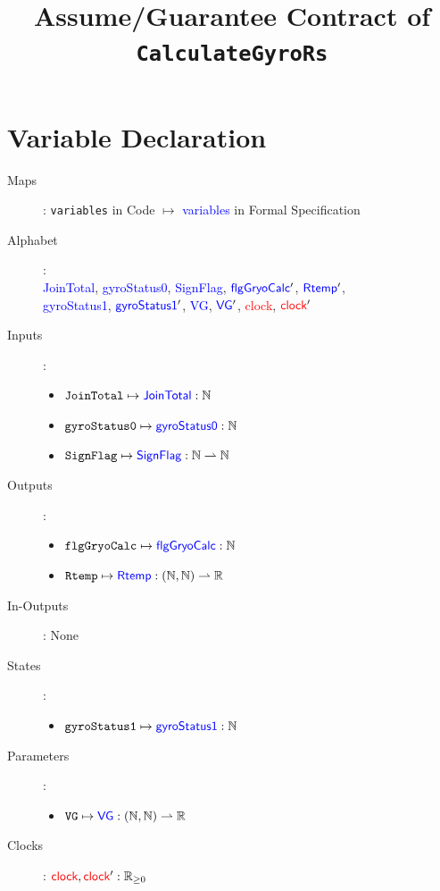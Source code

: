 \documentclass[fleqn,a4paper]{article}
\newcommand\var[1]{\texttt{#1}}
\newcommand\Var[1]{\textcolor{blue}{\textsf{#1}}}
\newcommand\clock{\textcolor{red}{\textsf{clock}}}
\begin{document}
\title{Assume/Guarantee Contract of \texttt{CalculateGyroRs}}
\author{}

\maketitle

\section{Variable Declaration}

\begin{description}
\item[Maps]: \var{variables} in Code $\mapsto$ \Var{variables} in Formal Specification

\item[Alphabet]: \\
\Var{JoinTotal},
\Var{gyroStatus0},
\Var{SignFlag},
$\Var{flgGryoCalc}'$,
$\Var{Rtemp}'$, \\
\Var{gyroStatus1},
$\Var{gyroStatus1}'$,
\Var{VG},
$\Var{VG}'$,
\clock,
$\clock'$

\item[Inputs]:
\begin{itemize}
\item $\var{JoinTotal} \mapsto \Var{JoinTotal} : \mathbb{N}$
\item $\var{gyroStatus0} \mapsto \Var{gyroStatus0} : \mathbb{N}$
\item $\var{SignFlag} \mapsto \Var{SignFlag} : \mathbb{N} \rightharpoonup \mathbb{N}$
\end{itemize}

\item[Outputs]:
\begin{itemize}
\item $\var{flgGryoCalc} \mapsto \Var{flgGryoCalc} : \mathbb{N}$
\item $\var{Rtemp} \mapsto \Var{Rtemp}:(\mathbb{N},\mathbb{N}) \rightharpoonup \mathbb{R}$
\end{itemize}

\item[In-Outputs]: None

\item[States]: 
\begin{itemize}
\item $\var{gyroStatus1} \mapsto \Var{gyroStatus1} : \mathbb{N}$
\end{itemize}

\item[Parameters]:
\begin{itemize}
\item $\var{VG} \mapsto \Var{VG}:(\mathbb{N},\mathbb{N}) \rightharpoonup \mathbb{R}$
\end{itemize}

\item[Clocks]:
$\clock,\clock':\mathbb{R}_{\geq 0}$

\end{description}
\end{document}
